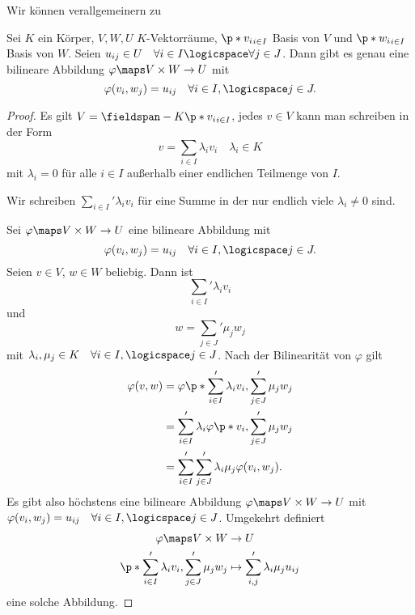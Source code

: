Wir können  verallgemeinern zu 
\begin{lemmastrich}\label{}
  Sei \( K \) ein Körper, \( V,W,U \) \( K \)-Vektorräume, \( \p*{v_i}_{i\in I} \) Basis von \( V \) und \( \p*{w_i}_{i\in I} \) Basis von \( W \). Seien \( u_{ij}\in U \quad \forall i\in I\logicspace \forall j\in J\). Dann gibt es genau eine bilineare Abbildung \( \varphi\maps V\times W\to U \) mit
  \begin{equation*}
    \varphi(v_i,w_j)=u_{ij}\quad \forall i\in I, \logicspace j\in J.
  \end{equation*}
\end{lemmastrich}
\begin{proof}
  Es gilt \( V=\fieldspan-{K}{\p*{v_i}_{i\in I}} \), \dh jedes \( v\in V \) kann man schreiben in der Form
  \begin{equation*}
    v=\sum_{i\in I} \lambda_i v_i\quad \lambda_i\in K
  \end{equation*}
  mit \( \lambda_i=0 \) für alle \( i\in I \) außerhalb einer endlichen Teilmenge von \( I \).
  \begin{notation*}
    Wir schreiben \( \sum_{i\in I}'\lambda_i v_i \) für eine Summe in der nur endlich viele \( \lambda_i\neq 0 \) sind.
  \end{notation*}
  Sei \( \varphi\maps V\times W\to U \) eine bilineare Abbildung mit
  \begin{equation*}
    \varphi(v_i,w_j)=u_{ij} \quad \forall i\in I,\logicspace j\in J.
  \end{equation*}
  Seien \( v\in V \), \( w\in W \) beliebig. Dann ist
  \begin{equation*}
    \sum_{i\in I}' \lambda_i v_i
  \end{equation*}
  und
  \begin{equation*}
    w=\sum_{j\in J}' \mu_j w_j
  \end{equation*}
  mit \( \lambda_i,\mu_j \in K\quad \forall i\in I,\logicspace j\in J \). Nach der Bilinearität von \( \varphi \) gilt
  \begin{align*}
    \varphi(v,w)&=\varphi\p*{\sum_{i\in I}'\lambda_i v_i,\sum_{j\in J}' \mu_j w_j}\\
    &=\sum_{i\in I}'\lambda_i \varphi \p*{v_i,\sum_{j\in J}'\mu_j w_j}\\
    &=\sum_{i\in I}'\sum_{j\in J}'\lambda_i \mu_j \varphi(v_i,w_j).
  \end{align*}
  Es gibt also höchstens eine bilineare Abbildung \( \varphi\maps V\times W\to U \) mit \( \varphi(v_i,w_j)=u_{ij}\quad \forall i\in I,\logicspace j\in J \). Umgekehrt definiert
  \begin{align*}
    \varphi\maps V\times W&\to U\\
    \p*{\sum_{i\in I}'\lambda_i v_i,\sum_{j\in J}'\mu_j w_j}&\mapsto \sum_{i,j}'\lambda_i \mu_j u_{ij}
  \end{align*}
  eine solche Abbildung.
\end{proof}
